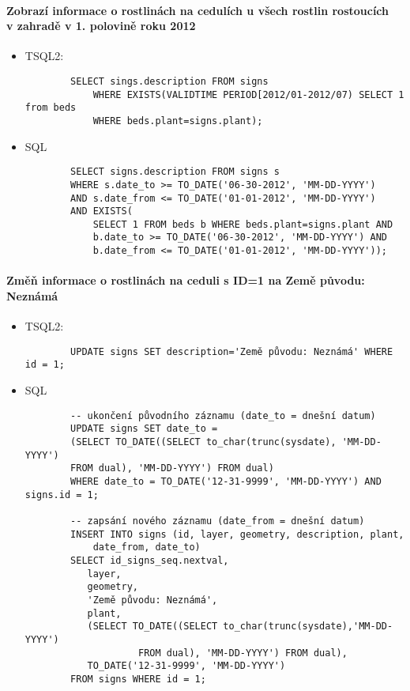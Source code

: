 \documentclass[12pt,a4paper]{article}
\begin{document}
\paragraph*{Zobrazí informace o rostlinách na cedulích u všech rostlin rostoucích \\ v zahradě v 1. polovině roku 2012}
\begin{itemize}

    \item
    TSQL2:
        \begin{verbatim}
        SELECT sings.description FROM signs
            WHERE EXISTS(VALIDTIME PERIOD[2012/01-2012/07) SELECT 1 from beds
            WHERE beds.plant=signs.plant);
        \end{verbatim}
    \newpage
    \item
    SQL
        \begin{verbatim}
        SELECT signs.description FROM signs s
        WHERE s.date_to >= TO_DATE('06-30-2012', 'MM-DD-YYYY')
        AND s.date_from <= TO_DATE('01-01-2012', 'MM-DD-YYYY')
        AND EXISTS(
            SELECT 1 FROM beds b WHERE beds.plant=signs.plant AND
            b.date_to >= TO_DATE('06-30-2012', 'MM-DD-YYYY') AND
            b.date_from <= TO_DATE('01-01-2012', 'MM-DD-YYYY'));
        \end{verbatim}

\end{itemize}

\paragraph*{Změň informace o rostlinách na ceduli s ID=1 na Země původu: Neznámá}
\begin{itemize}

    \item
    TSQL2:
        \begin{verbatim}
        UPDATE signs SET description='Země původu: Neznámá' WHERE id = 1;
        \end{verbatim}
    \item
    SQL
        \begin{verbatim}
        -- ukončení původního záznamu (date_to = dnešní datum)
        UPDATE signs SET date_to =
        (SELECT TO_DATE((SELECT to_char(trunc(sysdate), 'MM-DD-YYYY')
        FROM dual), 'MM-DD-YYYY') FROM dual)
        WHERE date_to = TO_DATE('12-31-9999', 'MM-DD-YYYY') AND signs.id = 1;

        -- zapsání nového záznamu (date_from = dnešní datum)
        INSERT INTO signs (id, layer, geometry, description, plant,
            date_from, date_to)
        SELECT id_signs_seq.nextval,
           layer,
           geometry,
           'Země původu: Neznámá',
           plant,
           (SELECT TO_DATE((SELECT to_char(trunc(sysdate),'MM-DD-YYYY')
                    FROM dual), 'MM-DD-YYYY') FROM dual),
           TO_DATE('12-31-9999', 'MM-DD-YYYY')
        FROM signs WHERE id = 1;
        \end{verbatim}

\end{itemize}
\end{document}
